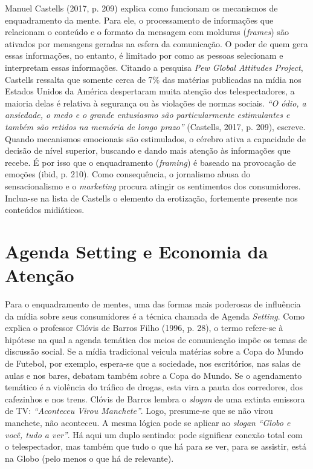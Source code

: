 Manuel Castells (2017, p. 209) explica como funcionam os mecanismos de
enquadramento da mente. Para ele, o processamento de informações que
relacionam o conteúdo e o formato da mensagem com molduras
(\emph{frames}) são ativados por mensagens geradas na esfera da
comunicação. O poder de quem gera essas informações, no entanto, é
limitado por como as pessoas selecionam e interpretam essas informações.
Citando a pesquisa \emph{Pew Global Attitudes Project}, Castells
ressalta que somente cerca de 7\% das matérias publicadas na mídia nos
Estados Unidos da América despertaram muita atenção dos telespectadores,
a maioria delas é relativa à segurança ou às violações de normas
sociais. \emph{``O ódio, a ansiedade, o medo e o grande entusiasmo são
particularmente estimulantes e também são retidos na memória de longo
prazo''} (Castells, 2017, p. 209), escreve. Quando mecanismos emocionais
são estimulados, o cérebro ativa a capacidade de decisão de nível
superior, buscando e dando mais atenção às informações que recebe. É por
isso que o enquadramento (\emph{framing}) é baseado na provocação de
emoções (ibid, p. 210). Como consequência, o jornalismo abusa do
sensacionalismo e o \emph{marketing} procura atingir os sentimentos dos
consumidores. Inclua-se na lista de Castells o elemento da erotização,
fortemente presente nos conteúdos midiáticos.

\section{Agenda Setting e Economia da Atenção}

Para o enquadramento de mentes, uma das formas mais poderosas de
influência da mídia sobre seus consumidores é a técnica chamada de
Agenda \emph{Setting}. Como explica o professor Clóvis de Barros Filho
(1996, p. 28), o termo refere-se à hipótese na qual a agenda temática
dos meios de comunicação impõe os temas de discussão social. Se a mídia
tradicional veicula matérias sobre a Copa do Mundo de Futebol, por
exemplo, espera-se que a sociedade, nos escritórios, nas salas de aulas
e nos bares, debatam também sobre a Copa do Mundo. Se o agendamento
temático é a violência do tráfico de drogas, esta vira a pauta dos
corredores, dos cafezinhos e nos trens. Clóvis de Barros lembra o
\emph{slogan} de uma extinta emissora de TV: \emph{``Aconteceu Virou
Manchete''}. Logo, presume-se que se não virou manchete, não aconteceu.
A mesma lógica pode se aplicar ao \emph{slogan} \emph{``Globo e você,
tudo a ver''}. Há aqui um duplo sentindo: pode significar conexão total
com o telespectador, mas também que tudo o que há para se ver, para se
assistir, está na Globo (pelo menos o que há de relevante).

